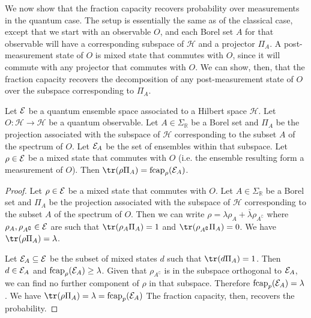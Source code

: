 We now show that the fraction capacity recovers probability over measurements in the quantum case. The setup is essentially the same as of the classical case, except that we start with an observable $O$, and each Borel set $A$ for that observable will have a corresponding subspace of $\mathcal{H}$ and a projector $\Pi_A$. A post-measurement state of $O$ is mixed state that commutes with $O$, since it will commute with any projector that commutes with $O$. We can show, then, that the fraction capacity recovers the decomposition of any post-measurement state of $O$ over the subspace corresponding to $\Pi_A$.

\begin{mathSection}
	\begin{prop}
		Let $\mathcal{E}$ be a quantum ensemble space associated to a Hilbert space $\mathcal{H}$. Let $O : \mathcal{H} \to \mathcal{H}$ be a quantum observable. Let $A \in \Sigma_{\mathbb{R}}$ be a Borel set and $\Pi_{A}$ be the projection associated with the subspace of $\mathcal{H}$ corresponding to the subset $A$ of the spectrum of $O$. Let $\mathcal{E}_A$ be the set of ensembles within that subspace. Let $\rho \in \mathcal{E}$ be a mixed state that commutes with $O$ (i.e. the ensemble resulting form a measurement of $O$). Then $\tr(\rho \Pi_A) = \fcap_{\rho}(\Ens_A)$.
	\end{prop}
	
	\begin{proof}
		Let $\rho \in \mathcal{E}$ be a mixed state that commutes with $O$. Let $A \in \Sigma_{\mathbb{R}}$ be a Borel set and $\Pi_{A}$ be the projection associated with the subspace of $\mathcal{H}$ corresponding to the subset $A$ of the spectrum of $O$. Then we can write $\rho = \lambda \rho_A + \bar{\lambda} \rho_{A^{\complement}}$ where $\rho_A, \rho_{A^{\complement}} \in \mathcal{E}$ are such that $\tr(\rho_A \Pi_A) = 1$ and  $\tr(\rho_{A^{\complement}} \Pi_A) = 0$. We have $\tr(\rho \Pi_A) = \lambda$.
		
		Let $\mathcal{E}_A \subseteq \mathcal{E}$ be the subset of mixed states $d$ such that $\tr(d \Pi_A) = 1$. Then $d \in \mathcal{E}_A$ and $\mathrm{fcap}_{\rho}(\mathcal{E}_A) \geq \lambda$. Given that $\rho_{A^{\complement}}$ is in the subspace orthogonal to $\mathcal{E}_A$, we can find no further component of $\rho$ in that subspace. Therefore $\mathrm{fcap}_{p}(\mathcal{E}_A) = \lambda$. We have $\tr(\rho \Pi_A) = \lambda = \fcap_{p}(\Ens_A)$ The fraction capacity, then, recovers the probability.
	\end{proof}
\end{mathSection}

